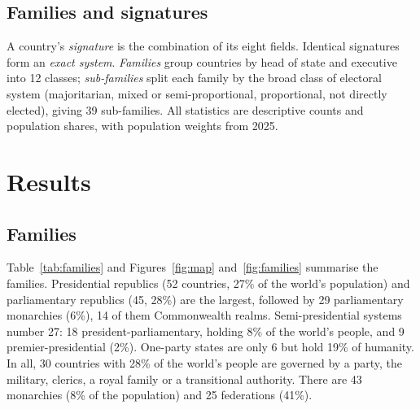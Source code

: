 \documentclass[11pt,a4paper]{article}
\begin{document}
\subsection{Families and signatures}
A country's \emph{signature} is the combination of its eight fields. Identical signatures form an \emph{exact system}. \emph{Families} group countries by head of state and executive into 12 classes; \emph{sub-families} split each family by the broad class of electoral system (majoritarian, mixed or semi-proportional, proportional, not directly elected), giving 39 sub-families. All statistics are descriptive counts and population shares, with population weights from 2025.

\section{Results}
\subsection{Families}
Table~\ref{tab:families} and Figures~\ref{fig:map} and~\ref{fig:families} summarise the families. Presidential republics (52 countries, 27\% of the world's population) and parliamentary republics (45, 28\%) are the largest, followed by 29 parliamentary monarchies (6\%), 14 of them Commonwealth realms. Semi-presidential systems number 27: 18 president-parliamentary, holding 8\% of the world's people, and 9 premier-presidential (2\%). One-party states are only 6 but hold 19\% of humanity. In all, 30 countries with 28\% of the world's people are governed by a party, the military, clerics, a royal family or a transitional authority. There are 43 monarchies (8\% of the population) and 25 federations (41\%).
\end{document}
